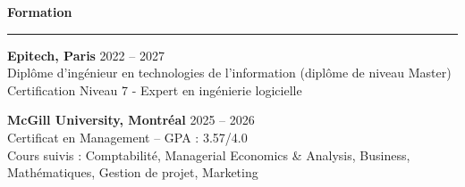 \documentclass[9pt]{extarticle}
\begin{document}
\par\vspace{8pt}

{\large\bfseries Formation}
\par\vspace{-8pt}
\rule{\linewidth}{0.4pt}
\par\vspace{5pt}

{\bfseries Epitech, Paris} \hfill 2022 -- 2027 \\
Diplôme d'ingénieur en technologies de l'information (diplôme de niveau Master) \\
Certification Niveau 7 - Expert en ingénierie logicielle

\vspace{6pt}

{\bfseries McGill University, Montréal} \hfill 2025 -- 2026 \\
Certificat en Management -- GPA : 3.57/4.0 \\
Cours suivis : Comptabilité, Managerial Economics \& Analysis, Business, Mathématiques, Gestion de projet, Marketing
\end{document}
